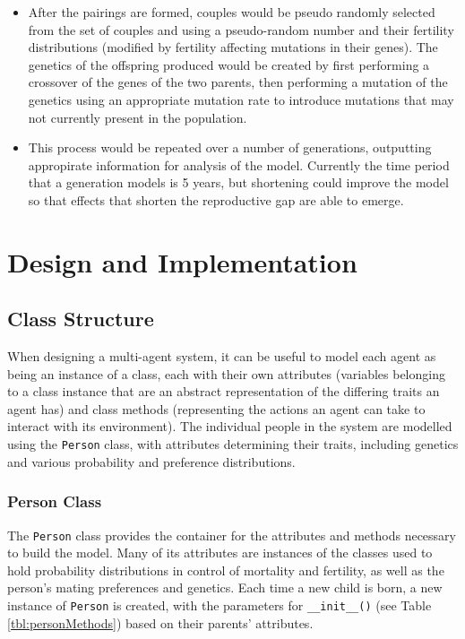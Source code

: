\documentclass[authoryearcitations]{UoYCSproject}
\begin{document}
\begin{itemize}
\item After the pairings are formed, couples would be pseudo randomly selected from the set of couples and using a pseudo-random number and their fertility distributions (modified by fertility affecting mutations in their genes). The genetics of the offspring produced would be created by first performing a crossover of the genes of the two parents, then performing a mutation of the genetics using an appropriate mutation rate to introduce mutations that may not currently present in the population.

\item This process would be repeated over a number of generations, outputting appropirate information for analysis of the model. Currently the time period that a generation models is 5 years, but shortening could improve the model so that effects that shorten the reproductive gap are able to emerge.

\end{itemize}

\chapter{Design and Implementation}
\label{cha:Design and Implementation}

\section{Class Structure}
When designing a multi-agent system, it can be useful to model each agent as being an instance of a class, each with their own attributes (variables belonging to a class instance that are an abstract representation of the differing traits an agent has) and class methods (representing the actions an agent can take to interact with its environment). The individual people in the system are modelled using the \texttt{Person} class, with attributes determining their traits, including genetics and various probability and preference distributions. 

\newpage
\subsection{Person Class}
The \texttt{Person} class provides the container for the attributes and methods necessary to build the model. Many of its attributes are instances of the classes used to hold probability distributions in control of mortality and fertility, as well as the person's mating preferences and genetics. Each time a new child is born, a new instance of \texttt{Person} is created, with the parameters for \texttt{\_\_init\_\_()} (see Table \ref{tbl:personMethods}) based on their parents' attributes.
\end{document}
